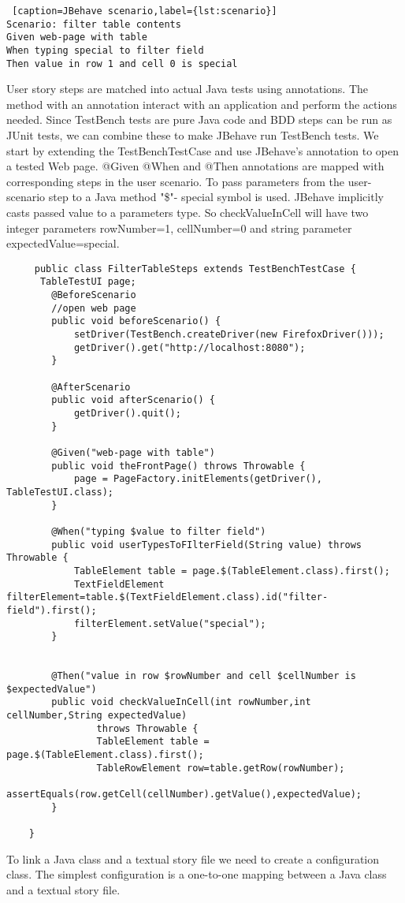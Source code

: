  \lstset{style=console}
  \begin{lstlisting} [caption=JBehave scenario,label={lst:scenario}]
Scenario: filter table contents
Given web-page with table
When typing special to filter field
Then value in row 1 and cell 0 is special
  \end{lstlisting}
User story steps are matched into actual Java tests using annotations. 
 The method with an annotation interact with an application and perform the actions needed.
  Since TestBench tests are pure Java code and BDD steps can be run as JUnit tests, we can combine these to make
   JBehave run TestBench tests. We start by extending the TestBenchTestCase  and use JBehave's \@BeforeScenario
   annotation to open a tested Web page.
   @Given @When and @Then annotations are mapped with corresponding steps in the user scenario.
   To pass parameters from the user-scenario step to a Java method "\$"- special symbol is used.
    JBehave implicitly casts passed value to a parameters type.
    So checkValueInCell will have two integer parameters rowNumber=1, cellNumber=0 and string parameter expectedValue=special. 

  	\lstset{language=Java}
  	\begin{lstlisting}
	 public class FilterTableSteps extends TestBenchTestCase {
	  TableTestUI page;
	    @BeforeScenario
	    //open web page
	    public void beforeScenario() {
	        setDriver(TestBench.createDriver(new FirefoxDriver()));
	        getDriver().get("http://localhost:8080");
	    }
	
	    @AfterScenario
	    public void afterScenario() {
	        getDriver().quit();
	    }
	
	    @Given("web-page with table")
	    public void theFrontPage() throws Throwable {
	        page = PageFactory.initElements(getDriver(), TableTestUI.class);
	    }
	
	    @When("typing $value to filter field")
	    public void userTypesToFIlterField(String value) throws Throwable {
	        TableElement table = page.$(TableElement.class).first();
			TextFieldElement filterElement=table.$(TextFieldElement.class).id("filter-field").first();
			filterElement.setValue("special");
	    }
	
	
	    @Then("value in row $rowNumber and cell $cellNumber is $expectedValue")
	    public void checkValueInCell(int rowNumber,int cellNumber,String expectedValue)
	            throws Throwable {
	            TableElement table = page.$(TableElement.class).first();
				TableRowElement row=table.getRow(rowNumber);
				assertEquals(row.getCell(cellNumber).getValue(),expectedValue);
	    }
	
	}
\end{lstlisting}
To link a Java class and a textual story file we need to create a configuration class.
The simplest configuration is a one-to-one mapping between a Java class and a textual story file. 

